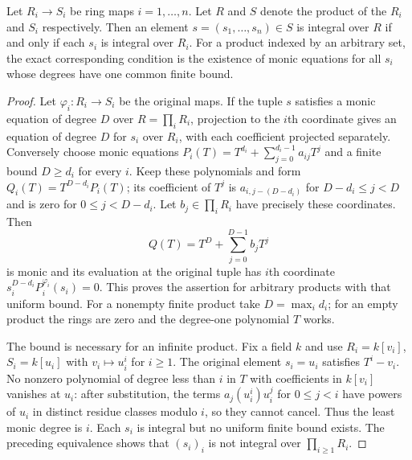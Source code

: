 \begin{lemma}
\label{lemma-finite-product-integral}
Let $R_i\to S_i$ be ring maps $i = 1, \ldots, n$.
Let $R$ and $S$ denote the product of the $R_i$ and $S_i$ respectively.
Then an element $s = (s_1, \ldots, s_n) \in S$ is integral over $R$
if and only if each $s_i$ is integral over $R_i$.
For a product indexed by an arbitrary set, the exact corresponding
condition is the existence of monic equations for all $s_i$ whose
degrees have one common finite bound.
\end{lemma}

\begin{proof}
Let $\varphi_i:R_i\to S_i$ be the original maps. If the tuple $s$
satisfies a monic equation of degree $D$ over $R=\prod_iR_i$,
projection to the $i$th coordinate gives an equation of degree $D$
for $s_i$ over $R_i$, with each coefficient projected separately.
Conversely choose monic equations
$P_i(T)=T^{d_i}+\sum_{j=0}^{d_i-1}a_{ij}T^j$ and a finite bound
$D\geq d_i$ for every $i$. Keep these polynomials and form
$Q_i(T)=T^{D-d_i}P_i(T)$; its coefficient of $T^j$ is
$a_{i,j-(D-d_i)}$ for $D-d_i\leq j<D$ and is zero for
$0\leq j<D-d_i$. Let $b_j\in\prod_iR_i$ have precisely these
coordinates. Then
$$
Q(T)=T^D+\sum_{j=0}^{D-1}b_jT^j
$$
is monic and its evaluation at the original tuple has $i$th coordinate
$s_i^{D-d_i}P_i^{\varphi_i}(s_i)=0$. This proves the assertion for
arbitrary products with that uniform bound. For a nonempty finite
product take $D=\max_i d_i$; for an empty product the rings are zero
and the degree-one polynomial $T$ works.

The bound is necessary for an infinite product. Fix a field $k$ and
use $R_i=k[v_i]$, $S_i=k[u_i]$ with $v_i\mapsto u_i^i$ for $i\geq1$.
The original element $s_i=u_i$ satisfies $T^i-v_i$.
No nonzero polynomial of degree less than $i$ in $T$ with
coefficients in $k[v_i]$ vanishes at $u_i$: after substitution,
the terms $a_j(u_i^i)u_i^j$ for $0\leq j<i$ have powers of $u_i$
in distinct residue classes modulo $i$, so they cannot cancel.
Thus the least monic degree is $i$. Each $s_i$ is integral but
no uniform finite bound exists. The preceding equivalence shows
that $(s_i)_i$ is not integral over $\prod_{i\geq1}R_i$.
\end{proof}